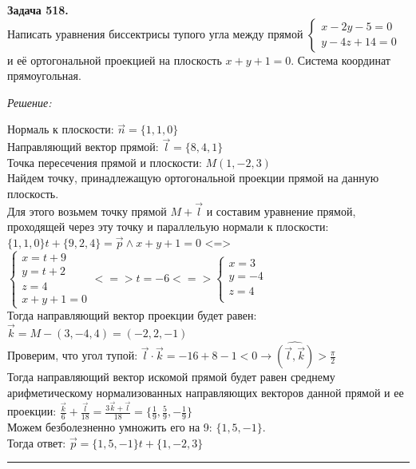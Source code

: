 \documentclass[a4paper, 12pt]{article}
\newenvironment{problem}[2][Задача]
    { \begin{mdframed}[backgroundcolor=gray!10] \textbf{#1 #2.} \\}
    {  \end{mdframed}}
\newenvironment{solution}
    {\textit{Решение: }}
    {\noindent\rule{7in}{1.5pt}}
\begin{document}
\begin{problem}{518}
Написать уравнения биссектрисы тупого угла между прямой
$
\left\{
\begin{array}{l}
x-2y-5 = 0 \\
y-4z+14= 0
\end{array}
\right.
$
и её ортогональной проекцией на плоскость ${x+y+1=0}$.
Система координат прямоугольная.
\end{problem}
\begin{solution}

Нормаль к плоскости: $\vec{n} = \{1, 1, 0\}$ \\
Направляющий вектор прямой: $\vec{l} = \{8, 4, 1\}$ \\
Точка пересечения прямой и плоскости: $M(1, -2, 3)$ \\
Найдем точку, принадлежащую ортогональной проекции прямой на данную плоскость. \\
Для этого возьмем точку прямой $M + \vec{l}$ и составим уравнение прямой, проходящей через эту точку и параллельую нормали к плоскости: \\
$\{1, 1, 0\}t + \{9, 2, 4\} = \vec{p} \land x + y + 1 = 0$ <=> \\
$
\left\{
  \begin{array}{rrrr}
    x = t + 9 \\
    y = t + 2 \\
    z = 4 \\
    x + y + 1 = 0
  \end{array}
\right.
<=> t = -6 <=>
\left\{
  \begin{array}{rrrr}
    x = 3 \\
    y = -4 \\
    z = 4 \\
  \end{array}
\right.
$ \\
Тогда направляющий вектор проекции будет равен: $\vec{k} = M - (3, -4, 4) = (-2, 2, -1)$ \\
Проверим, что угол тупой: $\vec{l} \cdot \vec{k} = -16 + 8 -1 < 0 \rightarrow \widehat{(\vec{l}, \vec{k})} > \frac{\pi}{2}$ \\
Тогда направляющий вектор искомой прямой будет равен среднему арифметическому нормализованных направляющих векторов данной прямой и ее проекции:
$\frac{\vec{k}}{6} + \frac{\vec{l}}{18} = \frac{3\vec{k} + \vec{l}}{18} = \{\frac{1}{9}, \frac{5}{9}, -\frac{1}{9}\}$ \\
Можем безболезненно умножить его на 9: $\{1, 5, -1\}$. \\
Тогда ответ: $\vec{p} = \{1, 5, -1\}t + \{1, -2, 3\}$


\end{solution}
\end{document}

